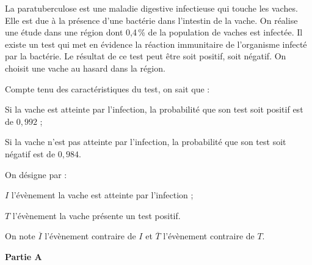 
	\medskip

La paratuberculose est une maladie digestive infectieuse qui touche les vaches. Elle est due à la présence d'une bactérie dans l'intestin de la vache.
On réalise une étude dans une région dont 0,4\,\% de la population de vaches est infectée.
Il existe un test qui met en évidence la réaction immunitaire de l'organisme infecté par la bactérie.
Le résultat de ce test peut être soit \og positif\fg{}, soit \og négatif\fg{}.
On choisit une vache au hasard dans la région.

\begin{list}{\textbullet}{Compte tenu des caractéristiques du test, on sait que :}
\item Si la vache est atteinte par l'infection, la probabilité que son test soit positif est de $0,992$ ;
\item Si la vache n'est pas atteinte par l'infection, la probabilité que son test soit négatif est de $0,984$.
\end{list}

\begin{list}{\textbullet}{On désigne par :}
		\item $I$ l'évènement \og{}la vache est atteinte par l'infection\fg{} ;
		\item $T$ l'évènement \og{}la vache présente un test positif\fg{}.
	\end{list}

On note $\overline{I}$ l'évènement contraire de $I$ et $\overline{T}$ l'évènement contraire de $T$.

%

\bigskip

\textbf{Partie A}

